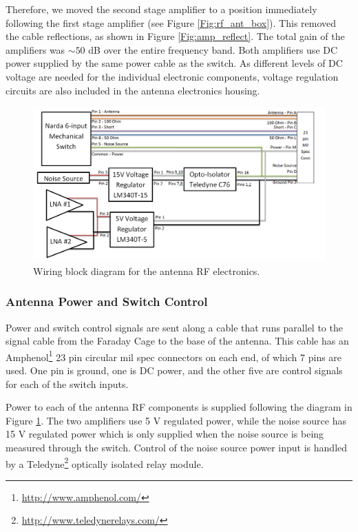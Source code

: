 Therefore, we moved the second stage amplifier to a position immediately following the first stage amplifier (see Figure \ref{Fig:rf_ant_box}). This removed the cable reflections, as shown in Figure \ref{Fig:amp_reflect}. The total gain of the amplifiers was $\sim 50$ dB over the entire frequency band. Both amplifiers use DC power supplied by the same power cable as the switch. As different levels of DC voltage are needed for the individual electronic components, voltage regulation circuits are also included in the antenna electronics housing. 

\begin{figure}[htb]
\begin{center}
\includegraphics[width=0.9\linewidth]{SCIHI_system/figures/antenna_rf_power_block_diagram.png}
\caption{Wiring block diagram for the antenna RF electronics.}
\label{Fig:ant_RF_pow_block_diagram}
\end{center}
\end{figure}

\subsubsection{Antenna Power and Switch Control} \label{Sec:ant_pow}

Power and switch control signals are sent along a cable that runs parallel to the signal cable from the Faraday Cage to the base of the antenna. This cable has an Amphenol\footnote{\url{http://www.amphenol.com/}} 23 pin circular mil spec connectors on each end, of which 7 pins are used. One pin is ground, one is DC power, and the other five are control signals for each of the switch inputs. 

Power to each of the antenna RF components is supplied following the diagram in Figure \ref{Fig:ant_RF_pow_block_diagram}. The two amplifiers use 5 V regulated power, while the noise source has 15 V regulated power which is only supplied when the noise source is being measured through the switch. Control of the noise source power input is handled by a Teledyne\footnote{\url{http://www.teledynerelays.com/}} optically isolated relay module. 

